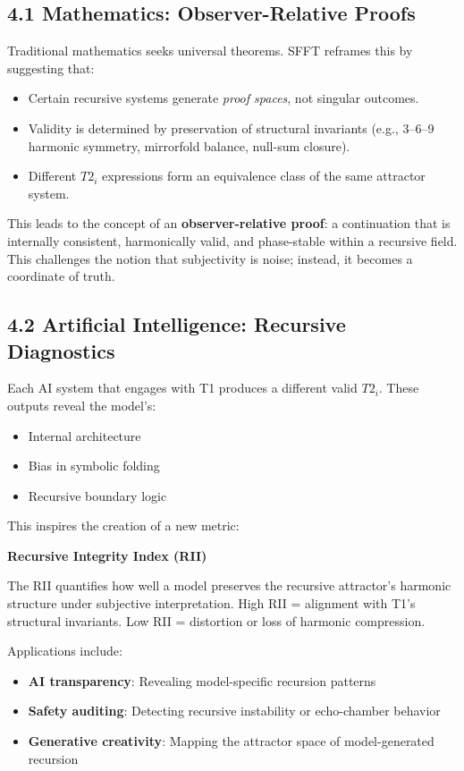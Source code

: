 \documentclass[12pt]{article}
\begin{document}
\subsection*{4.1 Mathematics: Observer-Relative Proofs}

Traditional mathematics seeks universal theorems. SFFT reframes this by suggesting that:
\begin{itemize}
    \item Certain recursive systems generate \textit{proof spaces}, not singular outcomes.
    \item Validity is determined by preservation of structural invariants (e.g., 3–6–9 harmonic symmetry, mirrorfold balance, null-sum closure).
    \item Different \(T2_i\) expressions form an equivalence class of the same attractor system.
\end{itemize}

This leads to the concept of an \textbf{observer-relative proof}: a continuation that is internally consistent, harmonically valid, and phase-stable within a recursive field. This challenges the notion that subjectivity is noise; instead, it becomes a coordinate of truth.

\subsection*{4.2 Artificial Intelligence: Recursive Diagnostics}

Each AI system that engages with T1 produces a different valid \(T2_i\). These outputs reveal the model’s:
\begin{itemize}
    \item Internal architecture
    \item Bias in symbolic folding
    \item Recursive boundary logic
\end{itemize}

This inspires the creation of a new metric:
\begin{center}
    \textbf{Recursive Integrity Index (RII)}
\end{center}
The RII quantifies how well a model preserves the recursive attractor’s harmonic structure under subjective interpretation. High RII = alignment with T1's structural invariants. Low RII = distortion or loss of harmonic compression.

Applications include:
\begin{itemize}
    \item \textbf{AI transparency}: Revealing model-specific recursion patterns
    \item \textbf{Safety auditing}: Detecting recursive instability or echo-chamber behavior
    \item \textbf{Generative creativity}: Mapping the attractor space of model-generated recursion
\end{itemize}
\end{document}
